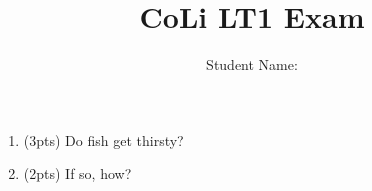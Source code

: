 \documentclass[10pt]{article}
\title{CoLi LT1 Exam}
\author{Student Name: \blank{12em}}}
\begin{document}
\maketitle
\begin{spacing}{1.1}

\begin{enumerate}[label=\bfseries Question \arabic*:]
\item (3pts) Do fish get thirsty?
\item (2pts) If so, how?
\end{enumerate}

\end{spacing}
\end{document}
